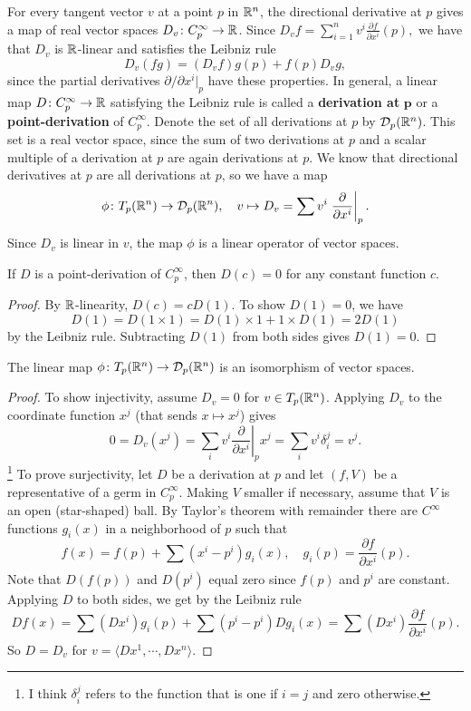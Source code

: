     For every tangent vector $v$ at a point $p$ in $\mathbb{R}^n $, the directional derivative at $p$ gives a map of real vector spaces $D_v \colon C_p^{\infty} \to \mathbb{R}$. Since $D_v f= \sum_{i=1}^{n} v^i  \frac{\partial f}{\partial x^i }(p),$ we have that $D_v$ is $\mathbb{R}$-linear and satisfies the Leibniz rule \[
        D_v(fg)=(D_vf)g(p)+f(p)D_vg,
    \] since the partial derivatives $\partial  / \partial x^i \big|_p$ have these properties. In general, a linear map $D \colon C_p^{\infty} \to \mathbb{R}$ satisfying the Leibniz rule is called a \textbf{derivation at} $\mathbf p$ or a \textbf{point-derivation} of $C_p^{\infty}$. Denote the set of all derivations at $p$ by $\mathcal{D} _p(\mathbb{R}^n )$. This set is a real vector space, since the sum of two derivations at $p$ and a scalar multiple of a derivation at $p$ are again derivations at $p$. We know that directional derivatives at $p$ are all derivations at $p$, so we have a map \[
    \phi \colon T_p(\mathbb{R}^n ) \to \mathcal{D} _p(\mathbb{R}^n ) , \quad v\mapsto D_v=\sum_{}^{} v^i  \left. \frac{\partial }{\partial x^i } \right| _p.
    \] Since $D_v$ is linear in $v$, the map $\phi$ is a linear operator of vector spaces.
    \begin{lemma}
        If $D$ is a point-derivation of $C_p^{\infty}$, then $D(c)=0$ for any constant function $c$.
    \end{lemma}
    \begin{proof}
        By $\mathbb{R}$-linearity, $D(c)=cD(1)$. To show $D(1)=0$, we have \[
            D(1)=D(1\times 1)=D(1)\times 1+1\times D(1)=2D(1)
        \] by the Leibniz rule. Subtracting $D(1)$ from both sides gives $D(1)=0$.
    \end{proof}
    \begin{theorem}
        The linear map $\phi \colon T_p(\mathbb{R}^n ) \to \mathcal{D} _p(\mathbb{R}^n )$ is an isomorphism of vector spaces.
    \end{theorem}
    \begin{proof}
        To show injectivity, assume $D_v=0$ for $v\in T_p(\mathbb{R}^n )$. Applying $D_v$ to the coordinate function $x^j$ (that sends $x\mapsto x^j$) gives \[
            0=D_v(x^j)=\sum_{i}^{} v^i \left. \frac{\partial }{\partial x^i } \right| _p x^j=\sum_{i}^{} v^i  \delta_i ^j=v^j.
            \] \footnote{I think $\delta_i ^j$ refers to the function that is one if $i=j$ and zero otherwise.} To prove surjectivity, let $D$ be a derivation at $p$ and let $(f,V)$ be a representative of a germ in $C_p^{\infty}$. Making $V$ smaller if necessary, assume that $V $ is an open (star-shaped) ball. By Taylor's theorem with remainder there are $C^{\infty}$ functions $g_i (x)$ in a neighborhood of $p$ such that \[
            f(x)=f(p)+\sum_{}^{} (x^i -p^i )g_i (x), \quad g_i (p)=\frac{\partial f}{\partial x^i }(p).
        \] Note that $D(f(p))$ and $D(p^i )$ equal zero since $f(p)$ and $p^i $ are constant. Applying $D$ to both sides, we get by the Leibniz rule \[
        D f(x)=\sum_{}^{} (Dx^i )g_i (p)+\sum (p^i -p^i ) Dg_i (x)=\sum (Dx^i ) \frac{\partial f}{\partial x^i }(p).
        \] So $D=D_v$ for $v=\langle Dx^1,\cdots ,Dx^n  \rangle $.
    \end{proof}
